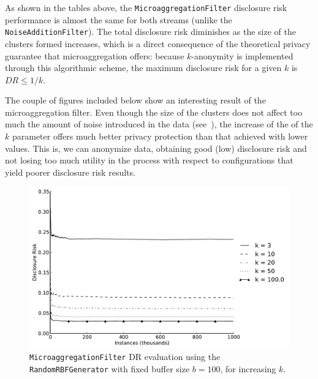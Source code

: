 As shown in the tables above, the \texttt{MicroaggregationFilter} disclosure risk performance is almost the same for both streams (unlike the \texttt{NoiseAdditionFilter}). The total disclosure risk diminishes as the size of the clusters formed increases, which is a direct consequence of the theoretical privacy guarantee that microaggregation offers: because $k$-anonymity is implemented through this algorithmic scheme, the maximum disclosure risk for a given $k$ is $DR \leq 1/k$.

The couple of figures included below show an interesting result of the microaggregation filter. Even though the size of the clusters does not affect too much the amount of noise introduced in the data (see~), the increase of the of the $k$ parameter offers much better privacy protection than that achieved with lower values. This is, we can anonymize data, obtaining good (low) disclosure risk and not losing too much utility in the process with respect to configurations that yield poorer disclosure risk results.

\begin{figure}[h]
	\centering
	\includegraphics[width=0.9\linewidth]{figures/dr_ma-random.pdf}
	\caption[Microaggregation DR evaluation ($b = 100$).]{\texttt{MicroaggregationFilter} DR evaluation using the \texttt{RandomRBFGenerator} with fixed buffer size $b = 100$, for increasing $k$.}
	\label{fig:results-dr-ma}
\end{figure}


